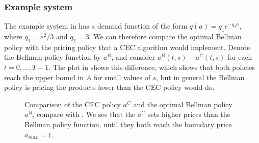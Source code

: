 \documentclass[main.tex]{subfiles}
\begin{document}
\subsubsection{Example system}
The example system in  has a demand
function of the form $q(a)=q_1e^{-q_2a}$, where $q_1=e^2/3$ and
$q_2=3$. We can therefore compare the optimal Bellman policy with the
pricing policy that a CEC algorithm would implement.
Denote the Bellman policy function by $a^B$, and consider
$a^B(t,s)-a^C(t,s)$ for each $t=0,\dots,T-1$. The plot in
 shows this difference, which
shows that both policies reach the upper bound in $A$ for small values
of $s$, but in general the Bellman policy is pricing the products
lower than the CEC policy would do.
\begin{figure}[htbp]
  \centering
  \caption{Comparison of the CEC policy $a^C$ and
    the optimal Bellman policy $a^B$, compare with
    .
    We see that the $a^C$ sets
    higher prices than the Bellman policy function, until they both reach the
    boundary price $a_{max}=1$.
  }\label{fig:bellman_det_policy_difference}
\end{figure}
\end{document}
